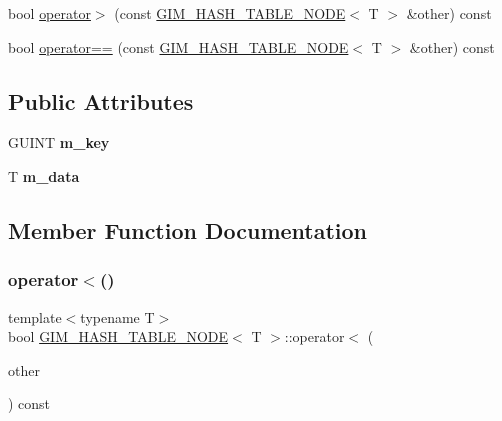 \begin{DoxyCompactItemize}
\item 
bool \hyperlink{structGIM__HASH__TABLE__NODE_acf7640e2bb9d45004154a4647eb4ef46}{operator$>$} (const \hyperlink{structGIM__HASH__TABLE__NODE}{G\+I\+M\+\_\+\+H\+A\+S\+H\+\_\+\+T\+A\+B\+L\+E\+\_\+\+N\+O\+DE}$<$ T $>$ \&other) const
\item 
bool \hyperlink{structGIM__HASH__TABLE__NODE_a94b797f611495d4e7661e7d188f61e38}{operator==} (const \hyperlink{structGIM__HASH__TABLE__NODE}{G\+I\+M\+\_\+\+H\+A\+S\+H\+\_\+\+T\+A\+B\+L\+E\+\_\+\+N\+O\+DE}$<$ T $>$ \&other) const
\end{DoxyCompactItemize}
\subsection*{Public Attributes}
\begin{DoxyCompactItemize}
\item 
\mbox{\label{structGIM__HASH__TABLE__NODE_a6774da7f36a0c162512a7105e0720686}} 
G\+U\+I\+NT {\bfseries m\+\_\+key}
\item 
\mbox{\label{structGIM__HASH__TABLE__NODE_abe8af1004fe6245b61321844b1929243}} 
T {\bfseries m\+\_\+data}
\end{DoxyCompactItemize}


\subsection{Member Function Documentation}
\mbox{\label{structGIM__HASH__TABLE__NODE_a79caf0e810ef6bf7acb17453fa60e2fc}} 
\subsubsection{\texorpdfstring{operator$<$()}{operator<()}\hspace{0.1cm}{\footnotesize\ttfamily [1/2]}}
{\footnotesize\ttfamily template$<$typename T$>$ \\
bool \hyperlink{structGIM__HASH__TABLE__NODE}{G\+I\+M\+\_\+\+H\+A\+S\+H\+\_\+\+T\+A\+B\+L\+E\+\_\+\+N\+O\+DE}$<$ T $>$\+::operator$<$ (\begin{DoxyParamCaption}\item[{const \hyperlink{structGIM__HASH__TABLE__NODE}{G\+I\+M\+\_\+\+H\+A\+S\+H\+\_\+\+T\+A\+B\+L\+E\+\_\+\+N\+O\+DE}$<$ T $>$ \&}]{other }\end{DoxyParamCaption}) const\hspace{0.3cm}{\ttfamily [inline]}}

